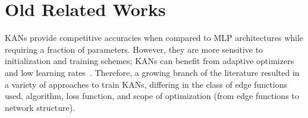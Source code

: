 \documentclass{article}
\begin{document}
\newpage
\section{Old Related Works}
KANs provide competitive accuracies when compared to MLP architectures while requiring a fraction of parameters.
However, they are more sensitive to initialization and training schemes; KANs can benefit from adaptive optimizers and low learning rates~\cite{sohail2024training}.
Therefore, a growing branch of the literature resulted in a variety of approaches to train KANs, differing in the class of edge functions used, algorithm, loss function, and scope of optimization (from edge functions to network structure).

\end{document}
